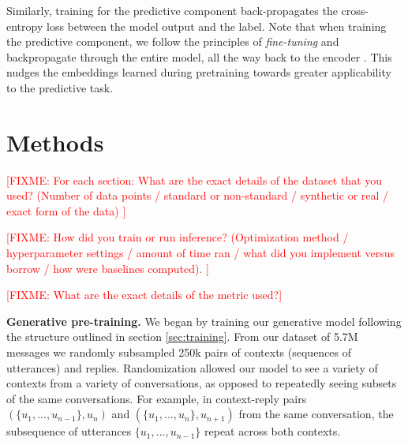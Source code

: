 \documentclass{article}
\newcommand{\fixme}[1]{\textcolor{red}{[FIXME: #1]}}
\begin{document}
Similarly, training for the predictive component back-propagates the cross-entropy loss between the model output and the label. Note that when training the predictive component, we follow the principles of \textit{fine-tuning} and backpropagate through the entire model, all the way back to the encoder \cite{howard2018universal}. This nudges the embeddings learned during pretraining towards greater applicability to the predictive task.









\section{Methods}
\label{sec:methods}

\fixme{For each section: What are the exact details of the dataset that you used? (Number of data points / standard or non-standard / synthetic or real / exact form of the data)
}

\fixme{
How did you train or run inference? (Optimization method / hyperparameter settings / amount of time ran / what did you implement versus borrow / how were baselines computed).
}

\fixme{What are the exact details of the metric used?}

\textbf{Generative pre-training.} We began by training our generative model following the structure outlined in section \ref{sec:training}. From our dataset of 5.7M messages we randomly subsampled 250k pairs of contexts (sequences of utterances) and replies. Randomization allowed our model to see a variety of contexts from a variety of conversations, as opposed to repeatedly seeing subsets of the same conversations. For example, in context-reply pairs $(\{u_1,...,u_{n-1}\}, u_{n})$ and $(\{u_1,...,u_{n}\}, u_{n+1})$ from the same conversation, the subsequence of utterances $\{u_1,...,u_{n-1}\}$ repeat across both contexts.
\end{document}
